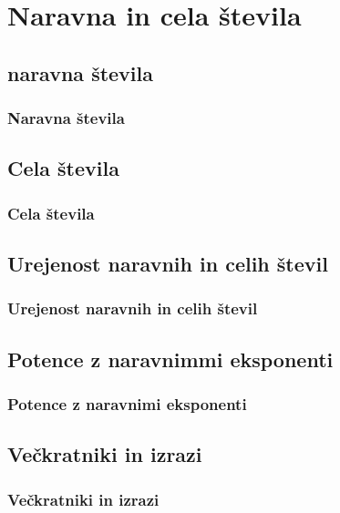 \section{Naravna in cela števila}

\begin{frame}
    \sectionpage
\end{frame}

\begin{frame}
\end{frame}

    \subsection{naravna števila}

        \begin{frame}
            \frametitle{Naravna števila}
        \end{frame}

    \subsection{Cela števila}

        \begin{frame}
            \frametitle{Cela števila}
        \end{frame}

    \subsection{Urejenost naravnih in celih števil}

        \begin{frame}
            \frametitle{Urejenost naravnih in celih števil}
        \end{frame}

    \subsection{Potence z naravnimmi eksponenti}

        \begin{frame}
            \frametitle{Potence z naravnimi eksponenti}
        \end{frame}

    \subsection{Večkratniki in izrazi}

        \begin{frame}
            \frametitle{Večkratniki in izrazi}
        \end{frame}
